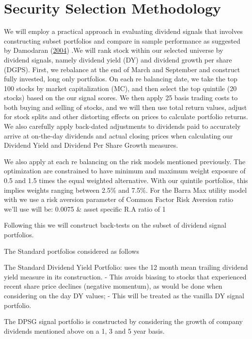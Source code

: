 \documentclass[11pt,preprint, authoryear]{elsarticle}
\numberwithin{equation}{section}
\numberwithin{figure}{section}
\numberwithin{table}{section}
\begin{document}
\hypertarget{security-selection-methodology}{%
\section{Security Selection
Methodology}\label{security-selection-methodology}}

We will employ a practical approach in evaluating dividend signals that
involves constructing subset portfolios and compare in sample
performance as suggested by Damodaran
(\protect\hyperlink{ref-damodaran2004investment}{2004}) .We will rank
stock within our selected universe by dividend signals, namely dividend
yield (DY) and dividend growth per share (DGPS). First, we rebalance at
the end of March and September and construct fully invested, long only
portfolios. On each re balancing date, we take the top 100 stocks by
market capitalization (MC), and then select the top quintile (20 stocks)
based on the our signal scores. We then apply 25 basis trading costs to
both buying and selling of stocks, and we will then use total return
values, adjust for stock splits and other distorting effects on prices
to calculate portfolio returns. We also carefully apply back-dated
adjustments to dividends paid to accurately arrive at on-the-day
dividends and actual closing prices when calculating our Dividend Yield
and Dividend Per Share Growth measures.

We also apply at each re balancing on the risk models mentioned
previously. The optimization are constrained to have minimum and maximum
weight exposure of 0.5 and 1.5 times the equal weighted alternative.
With our quintile portfolios, this implies weights ranging between 2.5\%
and 7.5\%. For the Barra Max utility model with we use a risk aversion
parameter of Common Factor Risk Aversion ratio we'll use will be: 0.0075
\& asset specific R.A ratio of 1

Following this we will construct back-tests on the subset of dividend
signal portfolios.

The Standard portfolios considered as follows

The Standard Dividend Yield Portfolio: uses the 12 month mean trailing
dividend yield measure in its construction. - This avoids biasing to
stocks that experienced recent share price declines (negative momentum),
as would be done when considering on the day DY values; - This will be
treated as the vanilla DY signal portfolio.

The DPSG signal portfolio is constructed by considering the growth of
company dividends mentioned above on a 1, 3 and 5 year basis.
\end{document}
